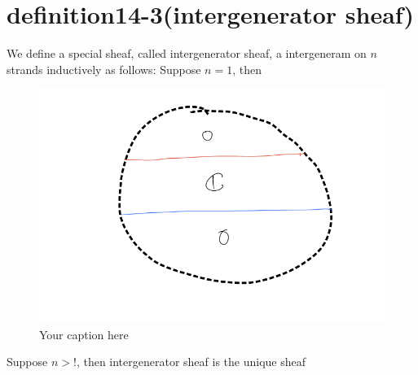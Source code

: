\section{definition14-3(intergenerator sheaf)}
\begin{definition}
\end{definition}

We define a special sheaf, called intergenerator sheaf, a intergeneram on $n$ strands inductively as follows: 
Suppose $n=1$, then

\begin{figure}[H] %
    \centering
    \includegraphics[width=\linewidth]{diagrams/definition14-3/1.png} %
    \caption{Your caption here}
    \label{fig:your-label}
\end{figure}

Suppose $n>!$, then intergenerator sheaf is the unique sheaf 

